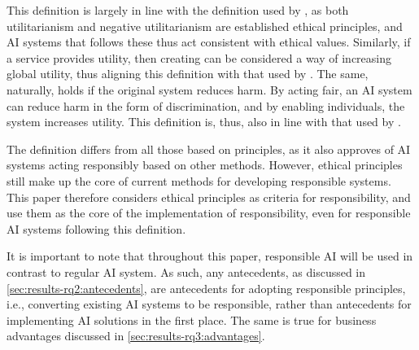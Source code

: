 This definition is largely in line with the definition used by \textcite{Doorn_2021}, as both utilitarianism and negative utilitarianism are established ethical principles, and AI systems that follows these thus act consistent with ethical values. Similarly, if a service provides utility, then creating  can be considered a way of increasing global utility, thus aligning this definition with that used by \textcite{WangY_2020}. The same, naturally, holds if the original system reduces harm. By acting fair, an AI system can reduce harm in the form of discrimination, and by enabling individuals, the system increases utility. This definition is, thus, also in line with that used by \textcite{Papagiannidis_2022}.

The definition differs from all those based on principles, as it also approves of AI systems acting responsibly based on other methods. However, ethical principles still make up the core of current methods for developing responsible systems. This paper therefore considers ethical principles as criteria for responsibility, and use them as the core of the implementation of responsibility, even for responsible AI systems following this definition.

It is important to note that throughout this paper, responsible AI will be used in contrast to regular AI system. As such, any antecedents, as discussed in \autoref{sec:results-rq2:antecedents}, are antecedents for adopting responsible principles, i.e., converting existing AI systems to be responsible, rather than antecedents for implementing AI solutions in the first place. The same is true for business advantages discussed in \autoref{sec:results-rq3:advantages}.